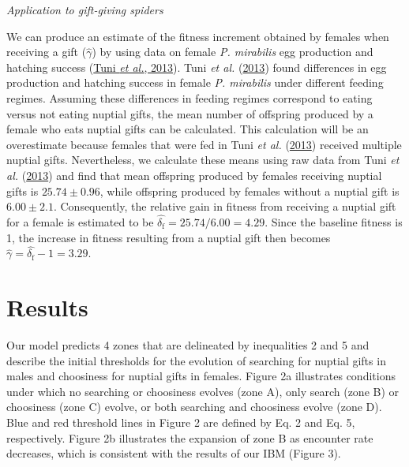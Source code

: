 \documentclass[
]{article}
\begin{document}
\emph{Application to gift-giving spiders}

We can produce an estimate of the fitness increment obtained by females
when receiving a gift (\(\hat{\gamma}\)) by using data on female
\emph{P. mirabilis} egg production and hatching success
(\protect\hyperlink{ref-Tuni2013a}{Tuni \emph{et al.}, 2013}). Tuni
\emph{et al.} (\protect\hyperlink{ref-Tuni2013a}{2013}) found
differences in egg production and hatching success in female \emph{P.
mirabilis} under different feeding regimes. Assuming these differences
in feeding regimes correspond to eating versus not eating nuptial gifts,
the mean number of offspring produced by a female who eats nuptial gifts
can be calculated. This calculation will be an overestimate because
females that were fed in Tuni \emph{et al.}
(\protect\hyperlink{ref-Tuni2013a}{2013}) received multiple nuptial
gifts. Nevertheless, we calculate these means using raw data from Tuni
\emph{et al.} (\protect\hyperlink{ref-Tuni2013a}{2013}) and find that
mean offspring produced by females receiving nuptial gifts is
\(25.74 \pm 0.96\), while offspring produced by females without a
nuptial gift is \(6.00 \pm 2.1\). Consequently, the relative gain in
fitness from receiving a nuptial gift for a female is estimated to be
\(\hat{\delta_\mathrm{f}} = 25.74 / 6.00 = 4.29\). Since the baseline
fitness is 1, the increase in fitness resulting from a nuptial gift then
becomes \(\hat{\gamma} = \hat{\delta_{\mathrm{f}}} - 1 = 3.29.\)

\hypertarget{results}{%
\section{Results}\label{results}}

Our model predicts 4 zones that are delineated by inequalities 2 and 5
and describe the initial thresholds for the evolution of searching for
nuptial gifts in males and choosiness for nuptial gifts in females.
Figure 2a illustrates conditions under which no searching or choosiness
evolves (zone A), only search (zone B) or choosiness (zone C) evolve, or
both searching and choosiness evolve (zone D). Blue and red threshold
lines in Figure 2 are defined by Eq. 2 and Eq. 5, respectively. Figure
2b illustrates the expansion of zone B as encounter rate decreases,
which is consistent with the results of our IBM (Figure 3).
\end{document}
